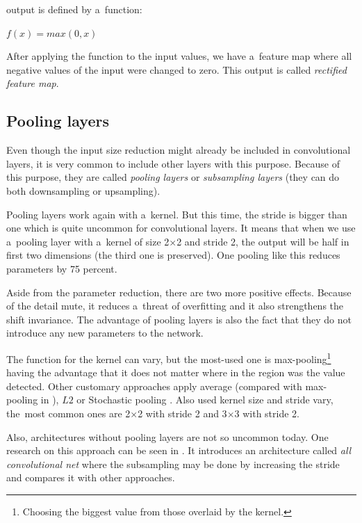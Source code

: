  output is defined by a~function:

$f(x) = max(0, x)$

After applying the  function to the input values, we have a~feature 
map where all negative values of the input were changed to zero. This output is 
called \textit{rectified feature map}. 

\subsection{Pooling layers}
\label{pooling}

Even though the input size reduction might already be included in convolutional 
layers, it is very common to include other layers with this purpose. Because 
of this purpose, they are called \textit{pooling layers} or \textit{subsampling 
layers} (they can do both downsampling or upsampling). 

Pooling layers work again with a~kernel. But this time, the stride is bigger 
than one which is quite uncommon for convolutional layers. It means that when we 
use a~pooling layer with a~kernel of size 2$\times$2 and stride 2, the output will 
be half in first two dimensions (the third one is preserved). One pooling like 
this reduces parameters by 75 percent. 

Aside from the parameter reduction, there are two more positive effects. Because 
of the detail mute, it reduces a~threat of overfitting and it also strengthens 
the shift invariance. The advantage of pooling layers is also the fact that they 
do not introduce any new parameters to the network. 

The function for the kernel can vary, but the most-used one is 
max-pooling\footnote{Choosing the biggest value from those overlaid by the 
kernel.} having the advantage that it does not matter where in the region was 
the value detected. Other customary approaches apply average (compared with 
max-pooling in \cite{avg-pooling}), $L2$ \cite{l2-pooling} or Stochastic pooling 
\cite{stoch-pooling}. Also used kernel size and stride vary, the~most common 
ones are 2$\times$2 with stride 2 and 3$\times$3 with stride 2. 

Also, architectures without pooling layers are not so uncommon today. One 
research on this approach can be seen in \cite{all-conv-net}. It introduces an 
architecture called \textit{all convolutional net} where the subsampling may be 
done by increasing the stride and compares it with other approaches. 

